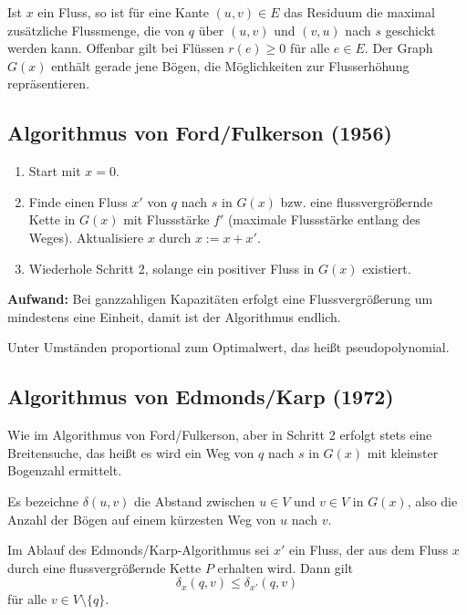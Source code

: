 \begin{rmrk*}
  Ist $x$ ein  Fluss, so ist für eine Kante $(u,v) \in E$  das Residuum die
  maximal zusätzliche Flussmenge, die von $q$ über $(u,v)$ und $(v,u)$ nach $s$
  geschickt werden kann. Offenbar gilt bei Flüssen $r(e) \ge 0$ für alle $e \in
  E$. Der Graph $G(x)$ enthält gerade jene Bögen, die Möglichkeiten zur
  Flusserhöhung repräsentieren.
\end{rmrk*}

\subsection{Algorithmus von Ford/Fulkerson (1956)}
\begin{enumerate}
\item Start mit $x = 0$.
\item Finde einen Fluss $x'$ von $q$ nach $s$ in $G(x)$ bzw. eine
  flussvergrößernde Kette in $G(x)$ mit Flussstärke $f'$ (maximale Flussstärke
  entlang des Weges). Aktualisiere $x$ durch $x := x + x'$.
\item Wiederhole Schritt 2, solange ein positiver Fluss in $G(x)$ existiert.
\end{enumerate}

\textbf{Aufwand:} Bei ganzzahligen Kapazitäten erfolgt eine Flussvergrößerung um
mindestens eine Einheit, damit ist der Algorithmus endlich.

Unter Umständen proportional zum Optimalwert, das heißt pseudopolynomial.

\subsection{Algorithmus von Edmonds/Karp (1972)}
Wie im Algorithmus von Ford/Fulkerson, aber in Schritt 2 erfolgt stets eine
Breitensuche, das heißt es wird ein Weg von $q$ nach $s$ in $G(x)$ mit kleinster
Bogenzahl ermittelt.

Es bezeichne $\delta(u,v)$ die Abstand zwischen $u \in V$ und $v \in V$ in
$G(x)$, also die Anzahl der Bögen auf einem kürzesten Weg von $u$ nach $v$.

\begin{lem} %
  Im Ablauf des Edmonds/Karp-Algorithmus sei $x'$ ein Fluss, der aus dem Fluss
  $x$ durch eine flussvergrößernde Kette $P$ erhalten wird. Dann gilt
  \[ \delta_x (q,v) \le \delta_{x'}(q,v) \]
  für alle $v \in V \setminus \{q\}$.
\end{lem}

